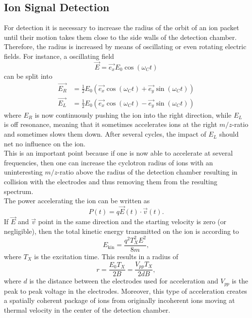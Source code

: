 \documentclass[a4paper,10pt]{article}
\begin{document}
\subsection{Ion Signal Detection}
For detection it is necessary to increase the radius of the orbit of an ion packet until their motion takes them close to the side walls of the detection chamber. Therefore, the radius is increased by means of oscillating or even rotating electric fields. For instance, a oscillating field
\begin{equation*}
	\vec{E} = \vec{e_x} E_0 \cos(\omega_C t)
\end{equation*}
can be split into
\begin{equation*}
	\begin{split}
		\vec{E_R} &= \frac{1}{2} E_0 (\vec{e_x} \cos(\omega_C t) + \vec{e_y}\sin(\omega_C t)) \\
		\vec{E_L} &= \frac{1}{2} E_0 (\vec{e_x} \cos(\omega_C t) - \vec{e_y}\sin(\omega_C t))
	\end{split}
\end{equation*}
where $E_R$ is now continuously pushing the ion into the right direction, while $E_L$ is off resonance, meaning that it sometimes accelerates ions at the right $m/z$-ratio and sometimes slows them down. After several cycles, the impact of $E_L$ should net no influence on the ion. \\
This is an important point because if one is now able to accelerate at several frequencies, then one can increase the cyclotron radius of ions with an uninteresting $m/z$-ratio above the radius of the detection chamber resulting in collision with the electrodes and thus removing them from the resulting spectrum. \\
The power accelerating the ion can be written as
\begin{equation}
	P(t) = q \vec{E}(t) \cdot \vec{v}(t).
\end{equation}
If $\vec{E}$ and $\vec{v}$ point in the same direction and the starting velocity is zero (or negligible), then the total kinetic energy transmitted on the ion is according to \cite{primer}
\begin{equation}
	E_\mathrm{kin} = \frac{q^2 T_X^2 E^2}{8m},
\end{equation}
where $T_X$ is the excitation time. This results in a radius of
\begin{equation}
	r = \frac{E_0 T_X}{2 B} = \frac{V_{pp} T_X}{2 d B},
\end{equation}
where $d$ is the distance between the electrodes used for acceleration and $V_{pp}$ is the peak to peak voltage in the electrodes. Moreover, this type of acceleration creates a spatially coherent package of ions from originally incoherent ions moving at thermal velocity in the center of the detection chamber.  \\
\end{document}
